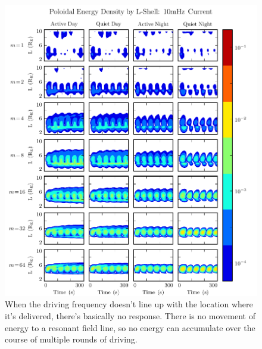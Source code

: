 \begin{figure}[H]
    \centering
    \includegraphics[width=\textwidth]{figures/ucolor_pol_010mHz.pdf}
    \caption[Poloidal Energy Density by L-Shell: 10mHz]{
      When the driving frequency doesn't line up with the location where it's delivered, there's basically no response. There is no movement of energy to a resonant field line, so no energy can accumulate over the course of multiple rounds of driving. 
    }
    \label{fig_ucolor_pol_010mHz}
\end{figure}


